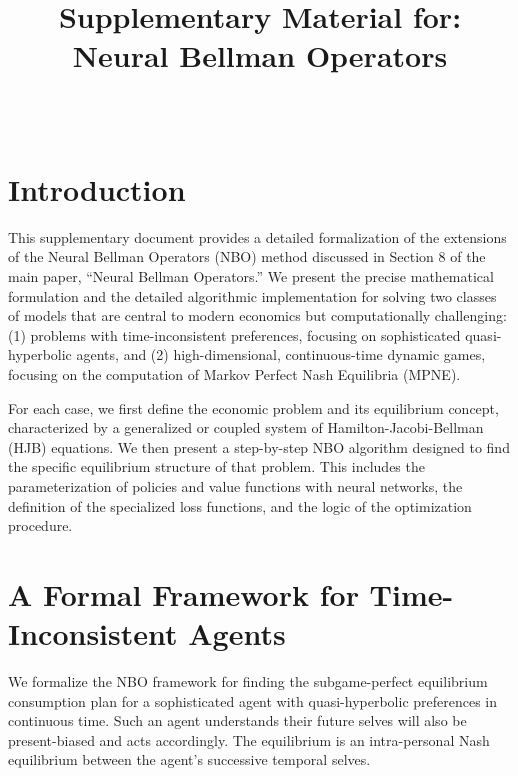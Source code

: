\documentclass[ecta,draft]{econsocart}
\theoremstyle{plain}
\theoremstyle{remark}
\begin{document}
\begin{frontmatter}

\title{Supplementary Material for: \\ Neural Bellman Operators}

\begin{aug}
\author[id=au1,addressref={add1}]
{~}
\address[id=add1]{Peking University}
\end{aug}

\end{frontmatter}

\section{Introduction}

This supplementary document provides a detailed formalization of the extensions of the Neural Bellman Operators (NBO) method discussed in Section 8 of the main paper, ``Neural Bellman Operators.'' We present the precise mathematical formulation and the detailed algorithmic implementation for solving two classes of models that are central to modern economics but computationally challenging: (1) problems with time-inconsistent preferences, focusing on sophisticated quasi-hyperbolic agents, and (2) high-dimensional, continuous-time dynamic games, focusing on the computation of Markov Perfect Nash Equilibria (MPNE).

For each case, we first define the economic problem and its equilibrium concept, characterized by a generalized or coupled system of Hamilton-Jacobi-Bellman (HJB) equations. We then present a step-by-step NBO algorithm designed to find the specific equilibrium structure of that problem. This includes the parameterization of policies and value functions with neural networks, the definition of the specialized loss functions, and the logic of the optimization procedure.

\section{A Formal Framework for Time-Inconsistent Agents}
\label{sec:supp_time_inconsistency}

We formalize the NBO framework for finding the subgame-perfect equilibrium consumption plan for a sophisticated agent with quasi-hyperbolic preferences in continuous time. Such an agent understands their future selves will also be present-biased and acts accordingly. The equilibrium is an intra-personal Nash equilibrium between the agent's successive temporal selves.
\end{document}
